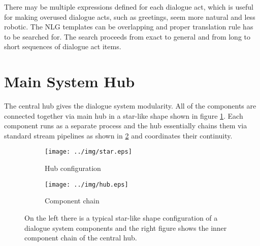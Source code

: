 \begin{table}[h]
\centering
\small
\hspace*{-3pt}
\caption{Translation example of dialogue act to sentence by Natural Language Generation component}
\label{table:nlg}
\end{table}

There may be multiple expressions defined for each dialogue act, which is useful for making overused dialogue acts, such as greetings, seem more natural and less robotic.
The NLG templates can be overlapping and proper translation rule has to be searched for.
The search proceeds from exact to general and from long to short sequences of dialogue act items.

\section{Main System Hub}

The central hub gives the dialogue system modularity.
All of the components are connected together via main hub in a star-like shape shown in figure \ref{fig:hub}.
Each component runs as a separate process and the hub essentially chains them via standard stream pipelines as shown in \ref{fig:chain} and coordinates their continuity.


\begin{figure}[ht]
\centering
\begin{subfigure}{0.5\textwidth}
  \centering
  \texttt{[image: ../img/star.eps]}
  \caption{Hub configuration}
  \label{fig:hub}
\end{subfigure}%
\begin{subfigure}{0.5\textwidth}
  \centering
  \texttt{[image: ../img/hub.eps]}
  \caption{Component chain}
  \label{fig:chain}
\end{subfigure}
\caption{On the left there is a typical star-like shape configuration of a dialogue system components and the right figure shows the inner component chain of the central hub.} %
\label{fig:test}
\end{figure}
